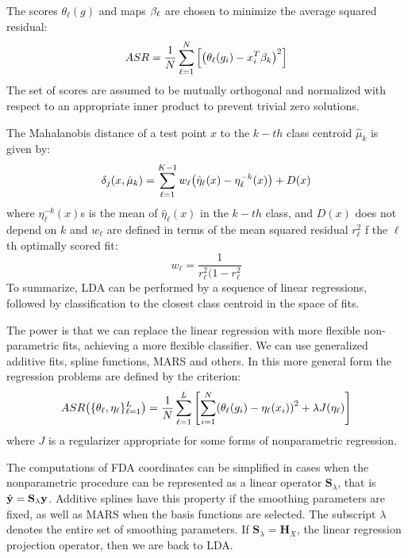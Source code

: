 The scores $\theta_\ell(g)$ and maps $\mathbf{\beta}_\ell$ are chosen to minimize the average squared residual:
\begin{equation}
ASR = \frac{1}{N}\sum_{\ell=1}^N\left[ \left(\theta_\ell(g_i) - x_i^T\mathbf{\beta}_k\right)^2\right]
\end{equation}
The set of scores are assumed to be mutually orthogonal and normalized with respect to an appropriate inner product to prevent trivial zero solutions.

The Mahalanobis distance of a test point $x$ to the $k-th$ class centroid $\hat{\mu}_k$ is given by:
\begin{equation}
\delta_j (x, \hat{\mu}_k) = \sum_{\ell=1}^{K-1} w_\ell \br{\hat{\eta}_\ell(x) - \eta_\ell^{-k}(x) }+D(x)
\end{equation}
where $\eta_\ell^{-k}(x) $s is the mean of $\hat{\eta}_\ell(x)$ in the $k-th$ class, and $D(x)$ does not depend on $k$ and $w_\ell$ are defined in terms of the mean squared residual $r_\ell^2$ f the $\ell$th optimally scored fit:
\begin{equation}
w_\ell = \frac{1}{r_\ell^2(1-r_\ell^2}
\end{equation}
To summarize, LDA can be performed by a sequence of linear regressions, followed by classification to the closest class centroid in the space of fits.

The power is that we can replace the linear regression with more flexible non-parametric fits, achieving a more flexible classifier. We can use generalized additive fits, spline functions, MARS and others. In this more general form the regression problems are defined by the criterion:
\begin{equation}
ASR \br{\{\theta_\ell, \eta_\ell \}_{\ell=1}^L} = \frac{1}{N}\sum_{\ell=1}^L\left[\sum_{i=1}^N \br{\theta_\ell(g_i) - \eta_\ell(x_i)}^2 + \lambda J(\eta_\ell)\right]
\end{equation}
where $J$ is a regularizer appropriate for some forms of nonparametric regression.

The computations of FDA coordinates can be simplified in cases when the nonparametric procedure can be represented as a linear operator $\mathbf{S}_\lambda$, that is $\hat{\mathbf{y}} =\mathbf{S}_\lambda \mathbf{y}$. Additive splines have this property if the smoothing parameters are fixed, as well as MARS when the basis functions are selected. The subscript $\lambda$ denotes the entire set of smoothing parameters. If $\mathbf{S}_\lambda = \mathbf{H}_X$, the linear regression projection operator, then we are back to LDA.

